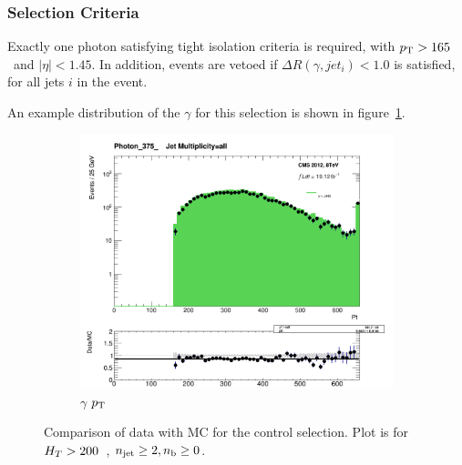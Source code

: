 \subsubsection{Selection Criteria}
Exactly one photon satisfying tight isolation criteria is required, with 
${p_{\text T}} > 165$~\gev and $|\eta|<1.45$. In addition, events are vetoed if
$\Delta R(\gamma, jet_i)<1.0$ is satisfied, for all jets $i$ in the event.

An example distribution of the $\gamma$ \Pt for this selection is shown
in figure~\ref{fig:datamc_pho_inc}.

\begin{figure}[!ht]
  \centering
    \begin{subfigure}[b]{0.48\textwidth}
      \includegraphics[width=\textwidth]{Figs/datamc/pho/Stacked_PhotonPt_all_Photon_375_upwards}
      \caption{$\gamma$ ${p_{\text T}}$}
    \end{subfigure}
    \caption{\label{fig:datamc_pho_inc}
    Comparison of data with MC for the \gj control selection. Plot 
    is for $H_T>200$~\gev, $n_{\text{jet}}\geq2, n_{\text{b}}\geq0$.}
\end{figure}



